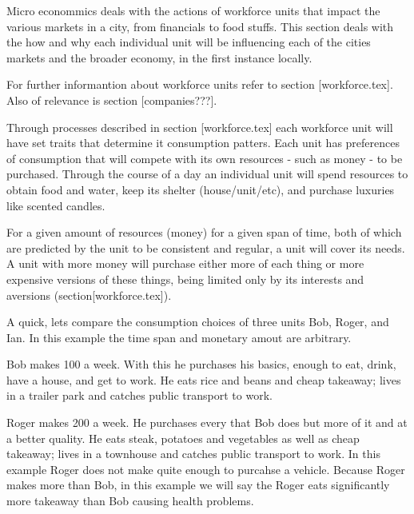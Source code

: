 


Micro econommics deals with the actions of workforce units that impact the various markets in a city, from financials to food stuffs. This section deals with the how and why each individual unit will be influencing each of the cities markets and the broader economy, in the first instance locally.

For further informantion about workforce units refer to section [workforce.tex]. Also of relevance is section [companies???].


Through processes described in section [workforce.tex] each workforce unit will have set traits that determine it consumption patters. Each unit has preferences of consumption that will compete with its own resources - such as money - to be purchased. Through the course of a day an individual unit will spend resources to obtain food and water, keep its shelter (house/unit/etc), and purchase luxuries like scented candles.




For a given amount of resources (money) for a given span of time, both of which are predicted by the unit to be consistent and regular, a unit will cover its needs. A unit with more money will purchase either more of each thing or more expensive versions of these things, being limited only by its interests and aversions (section[workforce.tex]).

A quick, lets compare the consumption choices of three units Bob, Roger, and Ian. In this example the time span and monetary amout are arbitrary. 

Bob makes 100 a week. With this he purchases his basics, enough to eat, drink, have a house, and get to work. He eats rice and beans and cheap takeaway; lives in a trailer park and catches public transport to work. 

Roger makes 200 a week. He purchases every that Bob does but more of it and at a better quality. He eats steak, potatoes and vegetables as well as cheap takeaway; lives in a townhouse and catches public transport to work. In this example Roger does not make quite enough to purcahse a vehicle. Because Roger makes more than Bob, in this example we will say the Roger eats significantly more takeaway than Bob causing health problems.

